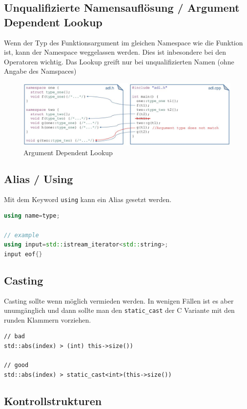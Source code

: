 \clearpage


\subsection{Unqualifizierte Namensauflösung / Argument Dependent Lookup}
Wenn der Typ des Funktionsargument im gleichen Namespace wie die Funktion ist, kann der Namespace weggelassen werden. Dies ist inbesondere bei den Operatoren wichtig. Das Lookup greift nur bei unqualifizierten Namen (ohne Angabe des Namspaces)
\begin{figure}[h]
\centering
\includegraphics[width=0.9\linewidth]{images/adl_examples}
\caption{Argument Dependent Lookup}
\label{fig:adlexamples}
\end{figure}

\subsection{Alias / Using}
Mit dem Keyword \lstinline|using| kann ein Alias gesetzt werden. 
\begin{lstlisting}[language=C++]
using name=type;

// example
using input=std::istream_iterator<std::string>;
input eof{}
\end{lstlisting}

\subsection{Casting}
Casting sollte wenn möglich vermieden werden. In wenigen Fällen ist es aber unumgänglich und dann sollte man den \lstinline|static_cast| der C Variante mit den runden Klammern vorziehen.
\begin{lstlisting}
// bad
std::abs(index) > (int) this->size()) 

// good
std::abs(index) > static_cast<int>(this->size())
\end{lstlisting}

\clearpage

\newpage

\subsection{Kontrollstrukturen}

